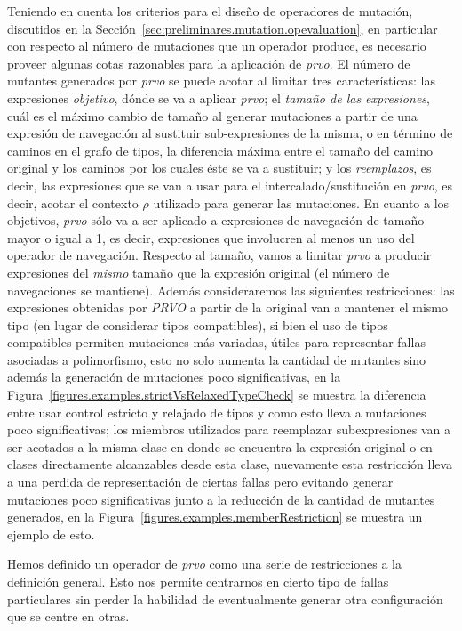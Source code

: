 Teniendo en cuenta los criterios para el dise\~no de operadores de mutaci\'on, discutidos en la Secci\'on~\ref{sec:preliminares.mutation.opevaluation}, en particular con respecto al n\'umero de mutaciones que un operador produce, es necesario proveer algunas cotas razonables para la aplicaci\'on de \emph{prvo}. El n\'umero de mutantes generados por \emph{prvo} se puede acotar al limitar tres caracter\'isticas: las expresiones \emph{objetivo}, d\'onde se va a aplicar \emph{prvo}; el \emph{tama\~no de las expresiones}, cu\'al es el m\'aximo cambio de tama\~no al generar mutaciones a partir de una expresi\'on de navegaci\'on al sustituir sub-expresiones de la misma, o en t\'ermino de caminos en el grafo de tipos, la diferencia m\'axima entre el tama\~no del camino original y los caminos por los cuales \'este se va a sustituir; y los \emph{reemplazos}, es decir, las expresiones que se van a usar para el intercalado/sustituci\'on en \emph{prvo}, es decir, acotar el contexto $\rho$ utilizado para generar las mutaciones. En cuanto a los objetivos, \emph{prvo} s\'olo va a ser aplicado a expresiones de navegaci\'on de tama\~no mayor o igual a 1, es decir, expresiones que involucren al menos un uso del operador de navegaci\'on. Respecto al tama\~no, vamos a limitar \emph{prvo} a producir expresiones del \emph{mismo} tama\~no que la expresi\'on original (el n\'umero de navegaciones se mantiene). Adem\'as consideraremos las siguientes restricciones: las expresiones obtenidas por \emph{PRVO} a partir de la original van a mantener el mismo tipo (en lugar de considerar tipos compatibles), si bien el uso de tipos compatibles permiten mutaciones m\'as variadas, \'utiles para representar fallas asociadas a polimorfismo, esto no solo aumenta la cantidad de mutantes sino adem\'as la generaci\'on de mutaciones poco significativas, en la Figura~\ref{figures.examples.strictVsRelaxedTypeCheck} se muestra la diferencia entre usar control estricto y relajado de tipos y como esto lleva a mutaciones poco significativas; los miembros utilizados para reemplazar subexpresiones van a ser acotados a la misma clase en donde se encuentra la expresi\'on original o en clases directamente alcanzables desde esta clase, nuevamente esta restricci\'on lleva a una perdida de representaci\'on de ciertas fallas pero evitando generar mutaciones poco significativas junto a la reducci\'on de la cantidad de mutantes generados, en la Figura~\ref{figures.examples.memberRestriction} se muestra un ejemplo de esto.

Hemos definido un operador de \emph{prvo} como una serie de restricciones a la definici\'on general. Esto nos permite centrarnos en cierto tipo de fallas particulares sin perder la habilidad de eventualmente generar otra configuraci\'on que se centre en otras.

